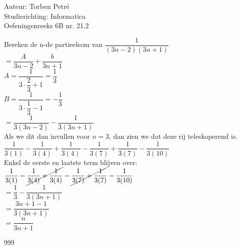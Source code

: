 \documentclass[a4paper]{article}
\begin{document}
  
\noindent \large Auteur: Torben Petré \\
\noindent \large Studierichting: Informatica\\
\noindent \large Oefeningenreeks 6B nr. 21.2\\

\medskip

\normalsize

Bereken de n-de partieelsom van $\dfrac{1}{(3n-2)(3n+1)}$ \\

$= \dfrac{A}{3n-2}+\dfrac{b}{3n+1}$ \\

$A = \dfrac{1}{3\cdot\dfrac{2}{3}+1} = \dfrac{1}{3}$ \\

$B = \dfrac{1}{3\cdot\dfrac{1}{3}-1} = -\dfrac{1}{3}$ \\

$= \dfrac{1}{3(3n-2)} - \dfrac{1}{3(3n+1)}$ \\

Als we dit dan invullen voor $n = 3$, dan zien we dat deze rij teleskoperend is. \\

$\dfrac{1}{3(1)} - \dfrac{1}{3(4)} + \dfrac{1}{3(4)} - \dfrac{1}{3(7)} + \dfrac{1}{3(7)} - \dfrac{1}{3(10)}$\\

Enkel de eerste en laatste term blijven over: \\

$\dfrac{1}{3(1)} - \cancel{\dfrac{1}{3(4)} + \dfrac{1}{3(4)}} - \cancel{\dfrac{1}{3(7)} + \dfrac{1}{3(7)}} - \dfrac{1}{3(10)}$\\

$= \dfrac{1}{3} - \dfrac{1}{3(3n + 1)}$ \\ 

$= \dfrac{3n + 1 - 1}{3(3n + 1)}$ \\

$= \dfrac{n}{3n+1}$						

\begin{thebibliography}{999}
\end{thebibliography}
\end{document}
